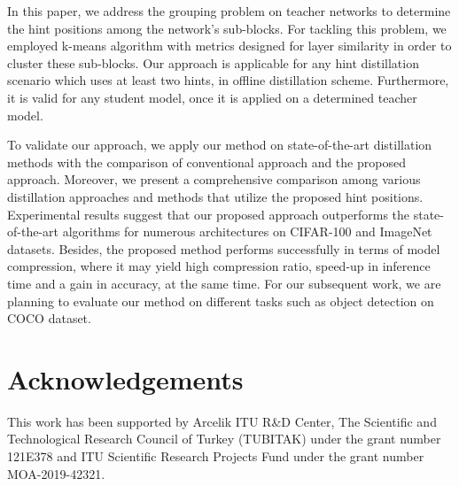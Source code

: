 \documentclass[final,3p,times]{elsarticle}
\begin{document}
In this paper, we address the grouping problem on teacher networks to determine the hint positions among the network's sub-blocks. For tackling this problem, we employed k-means algorithm with metrics designed for layer similarity in order to cluster these sub-blocks. Our approach is applicable for any hint distillation scenario which uses at least two hints, in offline distillation scheme. Furthermore, it is valid for any student model, once it is applied on a determined teacher model.

To validate our approach, we apply our method on state-of-the-art distillation methods with the comparison of conventional approach and the proposed approach. Moreover, we present a comprehensive comparison among various distillation approaches and methods that utilize the proposed hint positions. Experimental results suggest that our proposed approach outperforms the state-of-the-art algorithms for numerous architectures on CIFAR-100 and ImageNet datasets. Besides, the proposed method performs successfully in terms of model compression, where it may yield high compression ratio, speed-up in inference time and a gain in accuracy, at the same time. For our subsequent work, we are planning to evaluate our method on different tasks such as object detection on COCO dataset.

\section{Acknowledgements}
This work has been supported by Arcelik ITU R\&D Center, 
The Scientific and Technological Research Council of Turkey (TUBITAK) under the grant number 121E378 and ITU Scientific Research Projects Fund under the grant number MOA-2019-42321.


%
%

\end{document}
